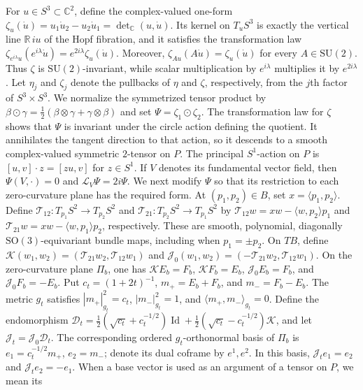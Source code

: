 \documentclass[11pt]{article}
\theoremstyle{definition}
\theoremstyle{remark}
\newcommand{\R}{\mathbb R}
\newcommand{\Id}{\operatorname{Id}}
\newcommand{\Lie}{\mathcal L}
\begin{document}
For $u\in S^3\subset\mathbb C^2$, define the complex-valued one-form
$\zeta_u(\dot u)=u_1\dot u_2-u_2\dot u_1
=\det_{\mathbb C}(u,\dot u)$.
Its kernel on $T_u S^3$ is exactly the vertical line $\R\,iu$ of the Hopf
fibration, and it satisfies the transformation law
$\zeta_{e^{i\lambda}u}(e^{i\lambda}\dot u)
=e^{2i\lambda}\zeta_u(\dot u)$.
Moreover, $\zeta_{Au}(A\dot u)=\zeta_u(\dot u)$ for every
$A\in\mathrm{SU}(2)$.
Thus $\zeta$ is $\mathrm{SU}(2)$-invariant, while scalar multiplication by
$e^{i\lambda}$ multiplies it by $e^{2i\lambda}$.  Let $\eta_j$ and $\zeta_j$
denote the pullbacks of $\eta$ and $\zeta$, respectively, from the $j$th
factor of $S^3\times S^3$.
We normalize the symmetrized tensor product by
$\beta\odot\gamma=\tfrac12(\beta\otimes\gamma+\gamma\otimes\beta)$ and set
$\Psi=\zeta_1\odot\zeta_2$.
The transformation law for $\zeta$ shows that $\Psi$ is invariant under the
circle action defining the quotient.  It annihilates the tangent direction
to that action,
so it descends to a smooth complex-valued symmetric $2$-tensor on $P$.  The
principal $S^1$-action on $P$ is
$[u,v]\cdot z=[zu,v]$ for $z\in S^1$.  If $V$ denotes its fundamental vector
field, then $\Psi(V,\cdot)=0$ and $\Lie_V\Psi=2i\Psi$.
We next modify $\Psi$ so that its restriction to each zero-curvature plane
has the required form.  At
$(p_1,p_2)\in B$, set $x=\langle p_1,p_2\rangle$.  Define
$\mathcal T_{12}:T_{p_1}S^2\to T_{p_2}S^2$ and
$\mathcal T_{21}:T_{p_2}S^2\to T_{p_1}S^2$ by
$\mathcal T_{12}w=xw-\langle w,p_2\rangle p_1$ and
$\mathcal T_{21}w=xw-\langle w,p_1\rangle p_2$, respectively.
These are smooth, polynomial, diagonally $\mathrm{SO}(3)$-equivariant bundle
maps, including when $p_1=\pm p_2$.  On $TB$, define
$\mathscr K(w_1,w_2)=(\mathcal T_{21}w_2,\mathcal T_{12}w_1)$ and
$\mathscr J_0(w_1,w_2)=(-\mathcal T_{21}w_2,\mathcal T_{12}w_1)$.
On the zero-curvature plane $\Pi_b$, one has
$\mathscr K E_b=F_b$, $\mathscr K F_b=E_b$,
$\mathscr J_0E_b=F_b$, and $\mathscr J_0F_b=-E_b$.  Put
$c_t=(1+2t)^{-1}$, $m_+=E_b+F_b$, and $m_-=F_b-E_b$.  The metric $g_t$
satisfies $|m_+|_{g_t}^2=c_t$, $|m_-|_{g_t}^2=1$, and
$\langle m_+,m_-\rangle_{g_t}=0$.
Define the endomorphism
$\mathscr D_t=\tfrac12(\sqrt{c_t}+c_t^{-1/2})\Id
+\tfrac12(\sqrt{c_t}-c_t^{-1/2})\mathscr K$, and let
$\mathscr J_t=\mathscr J_0\mathscr D_t$.  The corresponding ordered
$g_t$-orthonormal basis of $\Pi_b$ is
$e_1=c_t^{-1/2}m_+$, $e_2=m_-$; denote its dual coframe by
$e^1,e^2$.  In this basis, $\mathscr J_t e_1=e_2$ and
$\mathscr J_t e_2=-e_1$.
When a base vector is used as an argument of a tensor on $P$, we mean its
\end{document}
